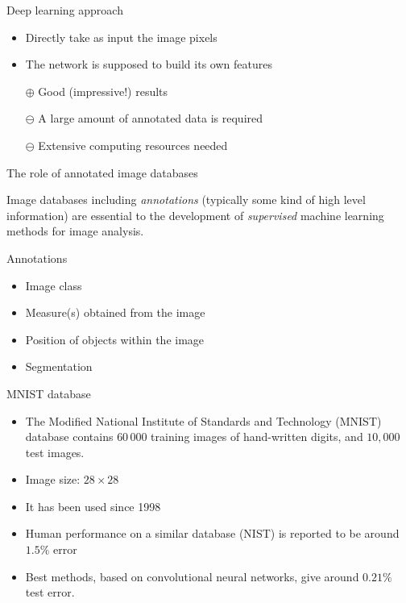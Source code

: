 \documentclass[xcolor=pdftex,dvipsnames,table,mathserif]{beamer}
\begin{document}
\begin{frame}{Deep learning approach}

  \begin{block}{}
    \begin{itemize}
    \item Directly take as input the image pixels
    \item The network is supposed to build its own features
    \end{itemize}
  \end{block}

  \begin{itemize}
  \item[$\oplus$] Good (impressive!) results
  \item[$\ominus$] A large amount of annotated data is required
  \item[$\ominus$] Extensive computing resources needed
  \end{itemize}

\end{frame}

\begin{frame}{The role of annotated image databases}

  Image databases including \emph{annotations} (typically some kind of high level information) are essential to the development of \emph{supervised} machine learning methods for image analysis.

  \begin{block}{Annotations}
    \begin{itemize}
    \item Image class
    \item Measure(s) obtained from the image
    \item Position of objects within the image
    \item Segmentation
    \end{itemize}
  \end{block}

\end{frame}

\begin{frame}{MNIST database \tiny{\cite{lecun_gradient-based_1998}}}

  \begin{itemize}
  \item The Modified National Institute of Standards and Technology (MNIST) database contains $60\,000$ training images of hand-written digits, and $10,000$ test images.
  \item Image size: $28 \times 28$
  \item It has been used since 1998
  \item Human performance on a similar database (NIST) is reported to be around $1.5\%$ error \cite{simard_efficient_1993}
  \item Best methods, based on convolutional neural networks, give around $0.21\%$ test error.
  \end{itemize}

\end{frame}
\end{document}
